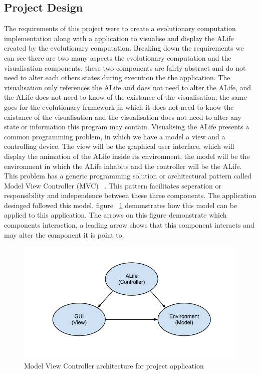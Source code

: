 \documentclass[12pt]{article}
\begin{document}
\subsection{Project Design}
The requirements of this project were to create a evolutionary computation implementation along with a application to visualise and
display the ALife created by the evolutionary computation. Breaking down the requirements we can see there are two many aspects
the evolutionary computation and the visualisation components, these two components are fairly abstract and do not need to alter
each others states during execution the the application. The visualisation only references the ALife and does not need to alter
the ALife, and the ALife does not need to know of the existance of the visualisation; the same goes for the evolutionary framework
in which it does not need to know the existance of the visualisation and the visualisation does not need to alter any state or
information this program may contain. Visualising the ALife presents a common programming problem, in which we have a model a view and a controlling
device. The view will be the graphical user interface, which will display the animation of the ALife inside its environment, the 
model will be the environment in which the ALife inhabits and the controller will be the ALife. This problem has a generic programming
solution or architectural pattern called Model View Controller (MVC) ~\cite{fowler03}. This pattern facilitates seperation or responsibility
and independence between these three components. The application desinged followed this model, figure ~\ref{fig:mvc} demonstrates 
how this model can be applied to this application. The arrows on this figure demonstrate which components interaction, a leading arrow
shows that this component interacts and may alter the component it is point to.

\begin{figure} [ht]
\centering
\includegraphics[scale = 0.5]{mvc.png}
\caption{Model View Controller architecture for project application}
\label{fig:mvc}
\end{figure}
\end{document}

